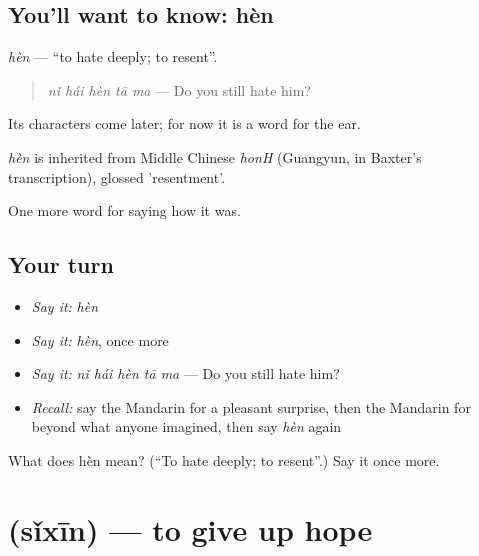 \subsection*{You'll want to know: hèn}
\emph{hèn} — \textquotedblleft{}to hate deeply; to resent\textquotedblright{}.

\begin{quote}
\emph{nǐ hái hèn tā ma} — Do you still hate him?
\end{quote}

Its characters come later; for now it is a word for the ear.

\begin{cousinweb}
\emph{hèn} is inherited from Middle Chinese \emph{honH} (Guangyun, in Baxter's transcription), glossed 'resentment'.
\end{cousinweb}

\begin{grammarlens}[title={What you've built}]
One more word for saying how it was.
\end{grammarlens}

\subsection*{Your turn}
\begin{itemize}
\raggedright
  \item \emph{Say it:} \emph{hèn}
  \item \emph{Say it:} \emph{hèn}, once more
  \item \emph{Say it:} \emph{nǐ hái hèn tā ma} — Do you still hate him?
  \item \emph{Recall:} say the Mandarin for a pleasant surprise, then the Mandarin for beyond what anyone imagined, then say \emph{hèn} again
\end{itemize}

\begin{tcolorbox}[breakable,colback=teal!4,colframe=teal!35!black,title={Before you move on}]
What does hèn mean? (\textquotedblleft{}To hate deeply; to resent\textquotedblright{}.) Say it once more.
\end{tcolorbox}
\section[\texorpdfstring{\zh{死心} (sǐxīn)}{死心 (sǐxīn)}]{ (sǐxīn) — to give up hope}

\label{lesson:ZH-C462-sixin}



